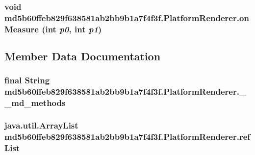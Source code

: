 \hypertarget{classmd5b60ffeb829f638581ab2bb9b1a7f4f3f_1_1_platform_renderer_08aa31496e02cae4a5b96c1668891094}{
\subsubsection[{onMeasure}]{\setlength{\rightskip}{0pt plus 5cm}void md5b60ffeb829f638581ab2bb9b1a7f4f3f.PlatformRenderer.onMeasure (int {\em p0}, \/  int {\em p1})}}
\label{classmd5b60ffeb829f638581ab2bb9b1a7f4f3f_1_1_platform_renderer_08aa31496e02cae4a5b96c1668891094}




\subsection{Member Data Documentation}
\hypertarget{classmd5b60ffeb829f638581ab2bb9b1a7f4f3f_1_1_platform_renderer_b4ebc79b3f389fb8fc2cf5953db2bf42}{
\subsubsection[{\_\-\_\-md\_\-methods}]{\setlength{\rightskip}{0pt plus 5cm}final String {\bf md5b60ffeb829f638581ab2bb9b1a7f4f3f.PlatformRenderer.\_\-\_\-md\_\-methods}}}
\label{classmd5b60ffeb829f638581ab2bb9b1a7f4f3f_1_1_platform_renderer_b4ebc79b3f389fb8fc2cf5953db2bf42}


\hypertarget{classmd5b60ffeb829f638581ab2bb9b1a7f4f3f_1_1_platform_renderer_d7349c32d4b68a5a1ca844cd7439dcaa}{
\subsubsection[{refList}]{\setlength{\rightskip}{0pt plus 5cm}java.util.ArrayList {\bf md5b60ffeb829f638581ab2bb9b1a7f4f3f.PlatformRenderer.refList}}}
\label{classmd5b60ffeb829f638581ab2bb9b1a7f4f3f_1_1_platform_renderer_d7349c32d4b68a5a1ca844cd7439dcaa}




